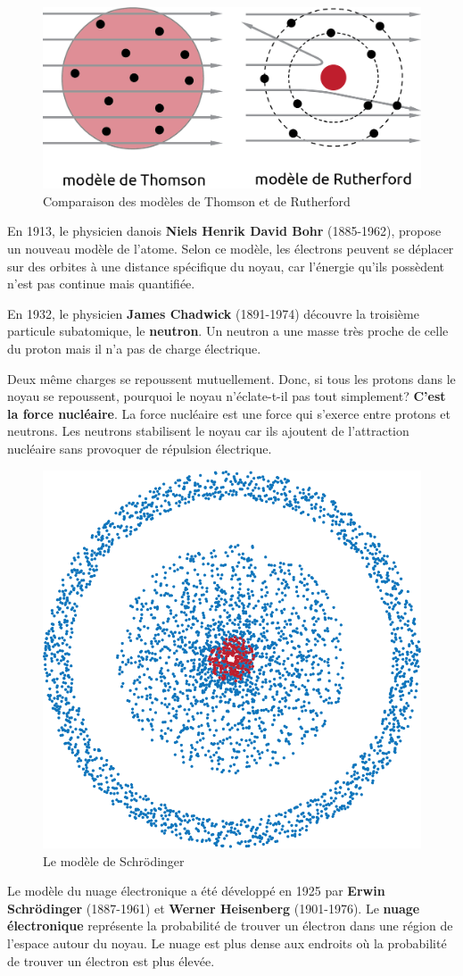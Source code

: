 \documentclass[
  11pt,
  a4paper,
  openany]{book}
\begin{document}
\begin{figure}

{\centering \includegraphics[width=0.4\linewidth]{images/exp-thomson-rutherford} 

}

\caption{Comparaison des modèles de Thomson et de Rutherford}\label{fig:exp-thomson-rutherford}
\end{figure}

En 1913, le physicien danois \textbf{Niels Henrik David Bohr} (1885-1962), propose un nouveau modèle de l'atome. Selon ce modèle, les électrons peuvent se déplacer sur des orbites à une distance spécifique du noyau, car l'énergie qu'ils possèdent n'est pas continue mais quantifiée.

En 1932, le physicien \textbf{James Chadwick} (1891-1974) découvre la troisième particule subatomique, le \textbf{neutron}. Un neutron a une masse très proche de celle du proton mais il n'a pas de charge électrique.

Deux même charges se repoussent mutuellement. Donc, si tous les protons dans le noyau se repoussent, pourquoi le noyau n'éclate-t-il pas tout simplement? \textbf{C'est la force nucléaire}. La force nucléaire est une force qui s'exerce entre protons et neutrons. Les neutrons stabilisent le noyau car ils ajoutent de l'attraction nucléaire sans provoquer de répulsion électrique.

\begin{figure}

{\centering \includegraphics[width=0.25\linewidth]{images/modeles-atomiques-cloud} 

}

\caption{Le modèle de Schrödinger}\label{fig:modeles-atomiques-cloud}
\end{figure}

Le modèle du nuage électronique a été développé en 1925 par \textbf{Erwin Schrödinger} (1887-1961) et \textbf{Werner Heisenberg} (1901-1976). Le \textbf{nuage électronique} représente la probabilité de trouver un électron dans une région de l'espace autour du noyau. Le nuage est plus dense aux endroits où la probabilité de trouver un électron est plus élevée.
\end{document}
